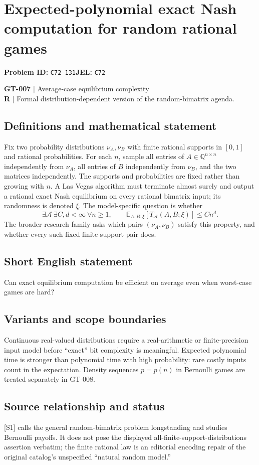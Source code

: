 \documentclass[11pt,a4paper]{article}
\begin{document}
\section*{Expected-polynomial exact Nash computation for random rational games}
\textbf{Problem ID:} \texttt{C72-131}\quad \textbf{JEL:} \texttt{C72}\par
\label{problem:OP-0137}
\label{game:GT-007}
{\sffamily\small\color{muted}
\textbf{GT-007} | Average-case equilibrium complexity\\
\textbf{R} | Formal distribution-dependent version of the random-bimatrix agenda.
\par}
\subsection*{Definitions and mathematical statement}
Fix two probability distributions $\nu_A,\nu_B$ with finite rational supports in $[0,1]$ and rational probabilities. For each $n$, sample all entries of $A\in\mathbb Q^{n\times n}$ independently from $\nu_A$, all entries of $B$ independently from $\nu_B$, and the two matrices independently. The supports and probabilities are fixed rather than growing with $n$. A Las Vegas algorithm must terminate almost surely and output a rational exact Nash equilibrium on every rational bimatrix input; its randomness is denoted $\xi$.
The model-specific question is whether
\[
 \exists\mathcal A\ \exists C,d<\infty\ \forall n\geq1,\qquad
 \mathbb E_{A,B,\xi}[T_{\mathcal A}(A,B;\xi)]\leq Cn^d.
\]
The broader research family asks which pairs $(\nu_A,\nu_B)$ satisfy this property, and whether every such fixed finite-support pair does.
\subsection*{Short English statement}
Can exact equilibrium computation be efficient on average even when worst-case games are hard?
\subsection*{Variants and scope boundaries}
Continuous real-valued distributions require a real-arithmetic or finite-precision input model before ``exact'' bit complexity is meaningful. Expected polynomial time is stronger than polynomial time with high probability: rare costly inputs count in the expectation. Density sequences $p=p(n)$ in Bernoulli games are treated separately in GT-008.
\subsection*{Source relationship and status}
[S1] calls the general random-bimatrix problem longstanding and studies Bernoulli payoffs. It does not pose the displayed all-finite-support-distributions assertion verbatim; the finite rational law is an editorial encoding repair of the original catalog's unspecified ``natural random model.''
\end{document}
